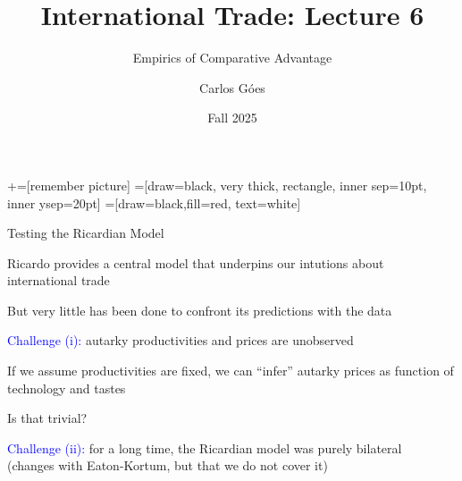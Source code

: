 \documentclass[notes,11pt, aspectratio=169, xcolor=table]{beamer}
\title[]{International Trade: Lecture 6}
\subtitle[]{Empirics of Comparative Advantage}
\author[Góes]
{Carlos Góes\inst{1}}
\date{Fall 2025}
\institute[GWU]{\inst{1} George Washington University }
\newcommand{\blue}[1]{\textcolor{blue}{#1}}
\newenvironment{wideitemize}{\itemize\addtolength{\itemsep}{10pt}}{\enditemize}
\begin{document}
\newcommand\marktopleft[1]{%
    \tikz[overlay,remember picture] 
        \node (marker-#1-a) at (-.3em,.3em) {};%
}
\newcommand\markbottomright[2]{%
    \tikz[overlay,remember picture] 
        \node (marker-#1-b) at (0em,0em) {};%
}
+=[remember picture] 
 =[draw=black, very thick, rectangle, inner sep=10pt, inner ysep=20pt]
 =[draw=black,fill=red, text=white]















\frame{\titlepage}
\addtocounter{framenumber}{-1}





\begin{frame}{Testing the Ricardian Model}
    \begin{wideitemize}
        \item Ricardo provides a central model that underpins our intutions about international trade

        \item But very little has been done to confront its predictions with the data

        \item \blue{Challenge (i):} autarky productivities and prices are unobserved

        \item If we assume productivities are fixed, we can ``infer'' autarky prices as function of technology and tastes

        \item Is that trivial?

        \item \blue{Challenge (ii):} for a long time, the Ricardian model was purely bilateral \\ 
        \qquad (changes with Eaton-Kortum, but that we do not cover it)

    \end{wideitemize}
\end{frame}
\end{document}
